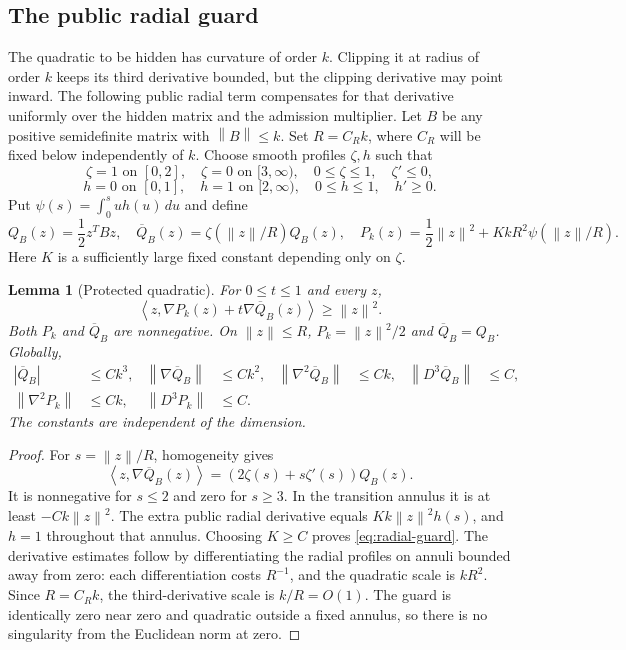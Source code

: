 \documentclass[11pt]{article}
\newtheorem{lemma}[theorem]{Lemma}
\theoremstyle{definition}
\theoremstyle{remark}
\newcommand{\norm}[1]{\left\|#1\right\|}
\newcommand{\ip}[2]{\left\langle#1,#2\right\rangle}
\begin{document}
\subsection{The public radial guard}
The quadratic to be hidden has curvature of order $k$.
Clipping it at radius of order $k$ keeps its third derivative bounded,
but the clipping derivative may point inward. The following public
radial term compensates for that derivative uniformly over the hidden
matrix and the admission multiplier.
Let $B$ be any positive semidefinite matrix with $\norm B\le k$. Set $R=C_Rk$, where $C_R$ will be fixed below independently of $k$. Choose smooth profiles $\zeta,h$ such that
\[
 \zeta=1\text{ on }[0,2],\quad\zeta=0\text{ on }[3,\infty),\quad
 0\le\zeta\le1,\quad\zeta'\le0,
\]
\[
 h=0\text{ on }[0,1],\quad h=1\text{ on }[2,\infty),\quad
 0\le h\le1,\quad h'\ge0.
\]
Put $\psi(s)=\int_0^s u h(u)\,du$ and define
\begin{equation}\label{eq:cap-guard}
 Q_B(z)=\frac12z^TBz,\quad
 \overline Q_B(z)=\zeta(\norm z/R)Q_B(z),\quad
 P_k(z)=\frac12\norm z^2+KkR^2\psi(\norm z/R).
\end{equation}
Here $K$ is a sufficiently large fixed constant depending only on $\zeta$.

\begin{lemma}[Protected quadratic]\label{lem:guard}
For $0\le t\le1$ and every $z$,
\begin{equation}\label{eq:radial-guard}
 \ip z{\nabla P_k(z)+t\nabla\overline Q_B(z)}\ge\norm z^2.
\end{equation}
Both $P_k$ and $\overline Q_B$ are nonnegative. On $\norm z\le R$, $P_k=\norm z^2/2$ and $\overline Q_B=Q_B$. Globally,
\begin{align}\label{eq:cap-bounds}
 |\overline Q_B|&\le Ck^3,&
 \norm{\nabla\overline Q_B}&\le Ck^2,&
 \norm{\nabla^2\overline Q_B}&\le Ck,&
 \norm{D^3\overline Q_B}&\le C,\\
 \norm{\nabla^2P_k}&\le Ck,&
 \norm{D^3P_k}&\le C.&&&&\nonumber
\end{align}
The constants are independent of the dimension.
\end{lemma}
\begin{proof}
For $s=\norm z/R$, homogeneity gives
\[
 \ip z{\nabla\overline Q_B(z)}=(2\zeta(s)+s\zeta'(s))Q_B(z).
\]
It is nonnegative for $s\le2$ and zero for $s\ge3$. In the transition annulus it is at least $-Ck\norm z^2$. The extra public radial derivative equals $Kk\norm z^2h(s)$, and $h=1$ throughout that annulus. Choosing $K\ge C$ proves \eqref{eq:radial-guard}. The derivative estimates follow by differentiating the radial profiles on annuli bounded away from zero: each differentiation costs $R^{-1}$, and the quadratic scale is $kR^2$. Since $R=C_Rk$, the third-derivative scale is $k/R=O(1)$. The guard is identically zero near zero and quadratic outside a fixed annulus, so there is no singularity from the Euclidean norm at zero.
\end{proof}
\end{document}
